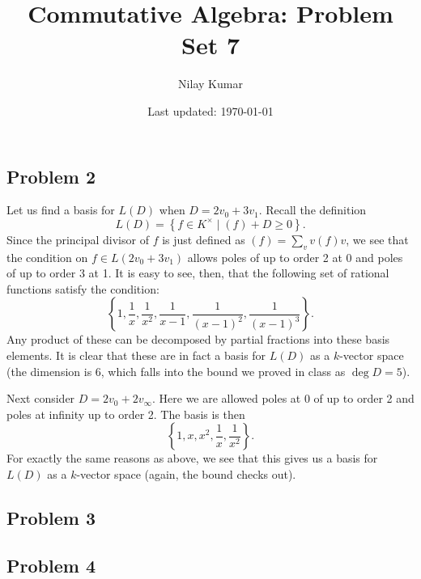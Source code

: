 \documentclass{../../mathnotes}
\title{Commutative Algebra: Problem Set 7}
\author{Nilay Kumar}
\date{Last updated: \today}
\begin{document}
\maketitle

\subsection*{Problem 2}

Let us find a basis for $L(D)$ when $D=2v_0+3v_1$. Recall the definition
\[L(D)=\left\{ f\in K^\times \mid (f)+D\geq 0 \right\}.\]
Since the principal divisor of $f$ is just defined as $(f)=\sum_v v(f) v$, we see that the condition on $f\in L(2v_0+3v_1)$ allows
poles of up to order 2 at 0 and poles of up to order 3 at 1. It is easy to see, then, that the following set of rational functions satisfy
the condition:
\[\left\{1,\frac{1}{x},\frac{1}{x^2},\frac{1}{x-1},\frac{1}{(x-1)^2},\frac{1}{(x-1)^3}\right\}.\]
Any product of these can be decomposed by partial fractions into these basis elements. It is clear that these are in fact a basis
for $L(D)$ as a $k$-vector space (the dimension is 6, which falls into the bound we proved in class as $\deg D=5$).

Next consider $D=2v_0+2v_\infty$. Here we are allowed poles at 0 of up to order 2 and poles at infinity up to order 2. The basis is then
\[\left\{ 1,x,x^2,\frac{1}{x},\frac{1}{x^2} \right\}.\]
For exactly the same reasons as above, we see that this gives us a basis for $L(D)$ as a $k$-vector space (again, the bound checks out).


\subsection*{Problem 3}

\subsection*{Problem 4}
\end{document}
